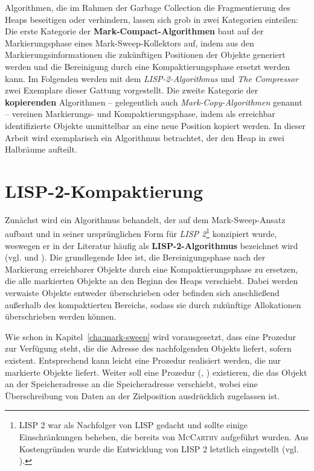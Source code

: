 Algorithmen, die im Rahmen der Garbage Collection die Fragmentierung des Heaps beseitigen oder verhindern, lassen sich grob in zwei Kategorien einteilen:
Die erste Kategorie der \textbf{Mark-Compact-Algorithmen} baut auf der Markierungsphase eines Mark-Sweep-Kollektors auf, indem aus den Markierungsinformationen die zukünftigen Positionen der Objekte generiert werden und die Bereinigung durch eine Kompaktierungsphase ersetzt werden kann.
Im Folgenden werden mit dem \textit{LISP-2-Algorithmus} und \textit{The Compressor} zwei Exemplare dieser Gattung vorgestellt.
Die zweite Kategorie der \textbf{kopierenden} Algorithmen -- gelegentlich auch \textit{Mark-Copy-Algorithmen} genannt -- vereinen Markierungs- und Kompaktierungsphase, indem als erreichbar identifizierte Objekte unmittelbar an eine neue Position kopiert werden.
In dieser Arbeit wird exemplarisch ein Algorithmus betrachtet, der den Heap in zwei Halbräume aufteilt.




\section{LISP-2-Kompaktierung}
\label{sec:lisp2-compact}
Zunächst wird ein Algorithmus behandelt, der auf dem Mark-Sweep-Ansatz aufbaut und in seiner ursprünglichen Form für \textit{LISP 2}\footnote{LISP 2 war als Nachfolger von LISP gedacht und sollte einige Einschränkungen beheben, die bereits von \textsc{McCarthy} aufgeführt wurden. Aus Kostengründen wurde die Entwicklung von LISP 2 letztlich eingestellt (vgl. \cite{lisp-history}).} konzipiert wurde, weswegen er in der Literatur häufig als \textbf{LISP-2-Algorithmus} bezeichnet wird (vgl. \cite[Kap. 3.2]{handbook} und \cite{lisp2gc}).
Die grundlegende Idee ist, die Bereinigungsphase nach der Markierung erreichbarer Objekte durch eine Kompaktierungsphase zu ersetzen, die alle markierten Objekte an den Beginn des Heaps verschiebt.
Dabei werden verwaiste Objekte entweder überschrieben oder befinden sich anschließend außerhalb des kompaktierten Bereichs, sodass sie durch zukünftige Allokationen überschrieben werden können.

Wie schon in Kapitel~\ref{cha:mark-sweep} wird vorausgesetzt, dass eine Prozedur zur Verfügung steht, die die Adresse des nachfolgenden Objekts liefert, sofern existent.
Entsprechend kann leicht eine Prozedur  realisiert werden, die nur markierte Objekte liefert.
Weiter soll eine Prozedur (, ) existieren, die das Objekt an der Speicheradresse  an die Speicheradresse  verschiebt, wobei eine Überschreibung von Daten an der Zielposition ausdrücklich zugelassen ist.

